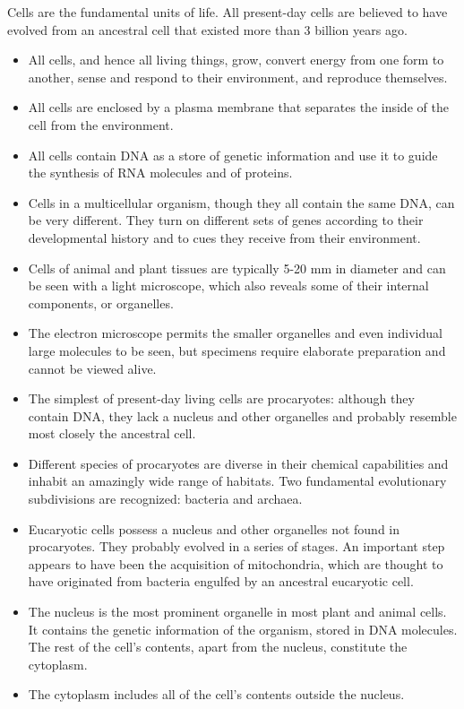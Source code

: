 Cells are the fundamental units of life. All present-day cells are
believed to have evolved from an ancestral cell that existed more
than 3 billion years ago.
\begin{itemize}
\item All cells, and hence all living things, grow, convert energy from one
form to another, sense and respond to their environment, and reproduce themselves.
\item All cells are enclosed by a plasma membrane that separates the inside
of the cell from the environment.
\item All cells contain DNA as a store of genetic information and use it to
guide the synthesis of RNA molecules and of proteins.
\item Cells in a multicellular organism, though they all contain the same
DNA, can be very different. They turn on different sets of genes
according to their developmental history and to cues they receive
from their environment.
\item Cells of animal and plant tissues are typically 5-20 mm in diameter
and can be seen with a light microscope, which also reveals some of
their internal components, or organelles.
\item The electron microscope permits the smaller organelles and even
individual large molecules to be seen, but specimens require elaborate preparation and cannot be viewed alive.
\item The simplest of present-day living cells are procaryotes: although
they contain DNA, they lack a nucleus and other organelles and probably resemble most closely the ancestral cell.
\item Different species of procaryotes are diverse in their chemical
capabilities and inhabit an amazingly wide range of habitats. Two
fundamental evolutionary subdivisions are recognized: bacteria and
archaea.
\item Eucaryotic cells possess a nucleus and other organelles not found in
procaryotes. They probably evolved in a series of stages. An important step appears to have been the acquisition of mitochondria, which
are thought to have originated from bacteria engulfed by an ancestral
eucaryotic cell.
\item The nucleus is the most prominent organelle in most plant and animal cells. It contains the genetic information of the organism, stored
in DNA molecules. The rest of the cell’s contents, apart from the
nucleus, constitute the cytoplasm.
\item The cytoplasm includes all of the cell’s contents outside the nucleus.

\end{itemize}
